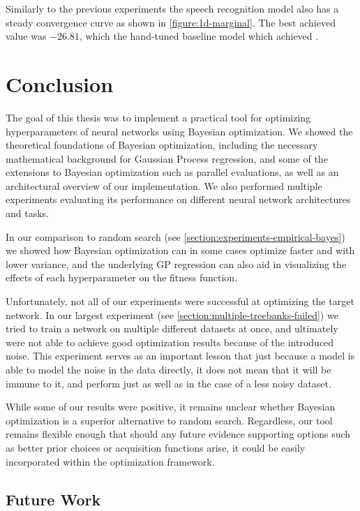 Similarly to the previous experiments the speech recognition model also has a steady convergence curve as shown in \autoref{figure:1d-marginal}. The best achieved value was $-26.81$, which  the hand-tuned baseline model which achieved .


\chapter{Conclusion}

The goal of this thesis was to implement a practical tool for optimizing hyperparameters of neural networks using Bayesian optimization. We showed the theoretical foundations of Bayesian optimization, including the necessary mathematical background for Gaussian Process regression, and some of the extensions to Bayesian optimization such as parallel evaluations, as well as an architectural overview of our implementation. We also performed multiple experiments evaluating its performance on different neural network architectures and tasks.

In our comparison to random search (see \autoref{section:experiments-empirical-bayes}) we showed how Bayesian optimization can in some cases optimize faster and with lower variance, and the underlying GP regression can also aid in visualizing the effects of each hyperparameter on the fitness function.

Unfortunately, not all of our experiments were successful at optimizing the target network. In our largest experiment (see \autoref{section:multiple-treebanks-failed}) we tried to train a network on multiple different datasets at once, and ultimately were not able to achieve good optimization results because of the introduced noise. This experiment serves as an important lesson that just because a model is able to model the noise in the data directly, it does not mean that it will be immune to it, and perform just as well as in the case of a less noisy dataset.

While some of our results were positive, it remains unclear whether Bayesian optimization is a superior alternative to random search. Regardless, our tool remains flexible enough that should any future evidence supporting options such as better prior choices or acquisition functions arise, it could be easily incorporated within the optimization framework.


\section{Future Work}

